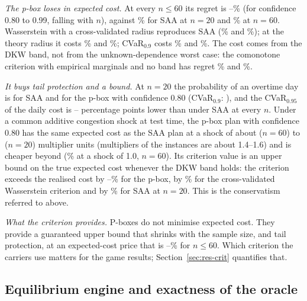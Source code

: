 \documentclass[preprint,12pt]{elsarticle}
\theoremstyle{definition}
\theoremstyle{remark}
\begin{document}
\emph{The p-box loses in expected cost.} At every $n\le60$ its regret is \AmbRegMin--\AmbRegMax\% (for confidence 0.80 to 0.99, falling with $n$), against \AmbSaaRegTwoZero\% for SAA at $n=20$ and \AmbSaaRegSixZero\% at $n=60$. Wasserstein with a cross-validated radius reproduces SAA (\AmbWcvRegTwoZero\% and \AmbWcvRegSixZero\%); at the theory radius it costs \AmbWthRegTwoZero\% and \AmbWthRegSixZero\%; CVaR$_{0.9}$ costs \AmbCvarRegTwoZero\% and \AmbCvarRegSixZero\%. The cost comes from the DKW band, not from the unknown-dependence worst case: the comonotone criterion with empirical marginals and no band has regret \AmbEmpRegTwoZero\% and \AmbEmpRegSixZero\%.

\emph{It buys tail protection and a bound.} At $n=20$ the probability of an overtime day is \AmbOtSaaTwoZero{} for SAA and \AmbOtPbTwoZero{} for the p-box with confidence 0.80 (CVaR$_{0.9}$: \AmbOtCvarTwoZero), and the CVaR$_{0.95}$ of the daily cost is \AmbCvarGainLo--\AmbCvarGainHi{} percentage points lower than under SAA at every $n$. Under a common additive congestion shock at test time, the p-box plan with confidence 0.80 has the same expected cost as the SAA plan at a shock of about \AmbCrossSixty{} ($n=60$) to \AmbCrossTwenty{} ($n=20$) multiplier units (multipliers of the instances are about 1.4--1.6) and is cheaper beyond (\AmbShiftOneSixty\% at a shock of 1.0, $n=60$). Its criterion value is an upper bound on the true expected cost whenever the DKW band holds: the criterion exceeds the realised cost by \AmbDisPbMin--\AmbDisPbMax\% for the p-box, by \AmbDisWcvTwoZero\% for the cross-validated Wasserstein criterion and by \AmbDisSaaTwoZero\% for SAA at $n=20$. This is the conservatism referred to above.

\emph{What the criterion provides.} P-boxes do not minimise expected cost. They provide a guaranteed upper bound that shrinks with the sample size, and tail protection, at an expected-cost price that is \AmbRegMin--\AmbRegMax\% for $n\le60$. Which criterion the carriers use matters for the game results; Section~\ref{sec:res-crit} quantifies that.

\subsection{Equilibrium engine and exactness of the oracle}\label{sec:res-engine}
\end{document}
